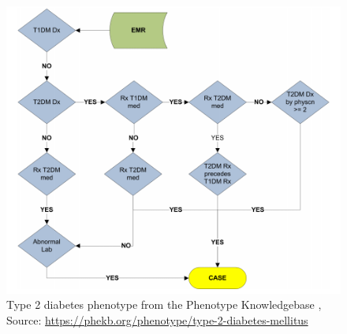 \documentclass{sig-alternate-05-2015}
\begin{document}
\begin{figure} [t]
\centering
\includegraphics[width=\linewidth]{t2d-pheno.png}
\caption{Type 2 diabetes phenotype from the Phenotype Knowledgebase \cite{kho_use_2012}, Source: \protect\url{https://phekb.org/phenotype/type-2-diabetes-mellitus}}
\label{fig:t2d-pheno}
\end{figure}
\end{document}
